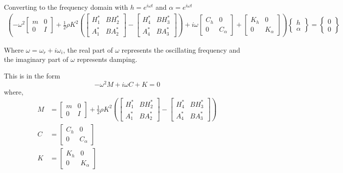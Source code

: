 \documentclass[a4paper, 12pt]{report}
\begin{document}
Converting to the frequency domain with $h = e^{i\omega t}$ and $\alpha = e^{i\omega t}$
\begin{multline}
    \left(
    -\omega^2 \begin{bmatrix} m & 0 \\ 0 & I \end{bmatrix}
    + \frac{1}{2}\rho K^2
    \left(
    \begin{bmatrix} H_1^* & BH_2^* \\ A_1^* & BA_2^* \end{bmatrix}
    - \begin{bmatrix} H_4^* & BH_3^* \\ A_4^* & BA_3^* \end{bmatrix}
    \right)
    + i\omega \begin{bmatrix} C_h & 0 \\ 0 & C_\alpha \end{bmatrix}
    + \begin{bmatrix} K_h & 0 \\ 0 & K_\alpha \end{bmatrix}
    \right)
    \begin{Bmatrix} h \\ \alpha \end{Bmatrix}
    = \begin{Bmatrix} 0 \\ 0 \end{Bmatrix}
\end{multline}

Where $\omega = \omega_r + i\omega_i$, the real part of $\omega$ represents the oscillating frequency and the imaginary part of $\omega$ represents damping.

This is in the form
\begin{equation}
    -\omega^2 M + i\omega C + K = 0
\end{equation}
where,
\begin{align}
    M &= \begin{bmatrix} m & 0 \\ 0 & I \end{bmatrix}
         + \frac{1}{2}\rho K^2
         \left(
         \begin{bmatrix} H_1^* & BH_2^* \\ A_1^* & BA_2^* \end{bmatrix}
         - \begin{bmatrix} H_4^* & BH_3^* \\ A_4^* & BA_3^* \end{bmatrix}
         \right) \\
    C &= \begin{bmatrix} C_h & 0 \\ 0 & C_\alpha \end{bmatrix} \\
    K &= \begin{bmatrix} K_h & 0 \\ 0 & K_\alpha \end{bmatrix}
\end{align}
\end{document}
